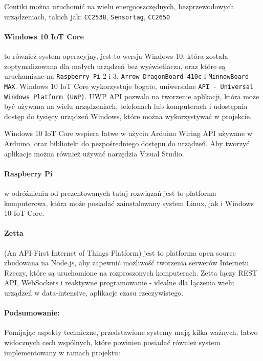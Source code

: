 Contiki można uruchomić na wielu energooszczędnych, bezprzewodowych urządzeniach, takich jak\cite{contiki-hardware-www}: \texttt{CC2538}, \texttt{Sensortag}, \texttt{CC2650}

\paragraph{Windows 10 IoT Core}\cite{windows-iot-www} to również system operacyjny, jest to wersja Windows 10, która została zoptymalizowana dla małych urządzeń bez wyświetlacza, oraz które są uruchamiane na \texttt{Raspberry Pi} 2 i 3, \texttt{Arrow DragonBoard 410c} i \texttt{MinnowBoard MAX}. 
Windows 10 IoT Core wykorzystuje bogate, uniwersalne \texttt{API - Universal Windows Platform (UWP)}. UWP API pozwala na tworzenie aplikacji, która może być używana na wielu urządzeniach, telefonach lub komputerach i udostępnia dostęp do tysięcy urządzeń Windows, które można wykorzystywać w projekcie.

Windows 10 IoT Core wspiera łatwe w użyciu Arduino Wiring API używane w Arduino, oraz biblioteki do pezpośredniego dostępu do urządzeń. Aby tworzyć aplikacje można również używać narzędzia Visual Studio.


\paragraph{Raspberry Pi}\cite{raspberry-www} w odróżnieniu od prezentowanych tutaj rozwiązań jest to platforma komputerowa, która może posiadać zainstalowany system Linux, jak i Windows 10 IoT Core.

\paragraph{Zetta}\cite{zetta-www} (An API-First Internet of Things Platform) jest to platforma open source zbudowana na Node.js, aby zapewnić możliwość tworzenia serwerów Internetu Rzeczy, które są uruchomione na rozproszonych komputerach. Zetta łączy REST API, WebSockets i reaktywne programowanie - idealne dla łączenia wielu urządzeń w data-intensive, aplikacje czasu rzeczywistego.

\paragraph{Podsumowanie:} Pomijając aspekty techniczne, przedstawione systemy mają kilka ważnych, łatwo widocznych cech wspólnych, które powinien posiadać również system implementowany w ramach projektu:

